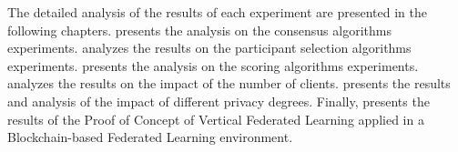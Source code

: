 The detailed analysis of the results of each experiment are presented in the following chapters.  presents the analysis on the consensus algorithms experiments.  analyzes the results on the participant selection algorithms experiments.  presents the analysis on the scoring algorithms experiments.  analyzes the results on the impact of the number of clients.  presents the results and analysis of the impact of different privacy degrees. Finally,  presents the results of the Proof of Concept of Vertical Federated Learning applied in a Blockchain-based Federated Learning environment.

